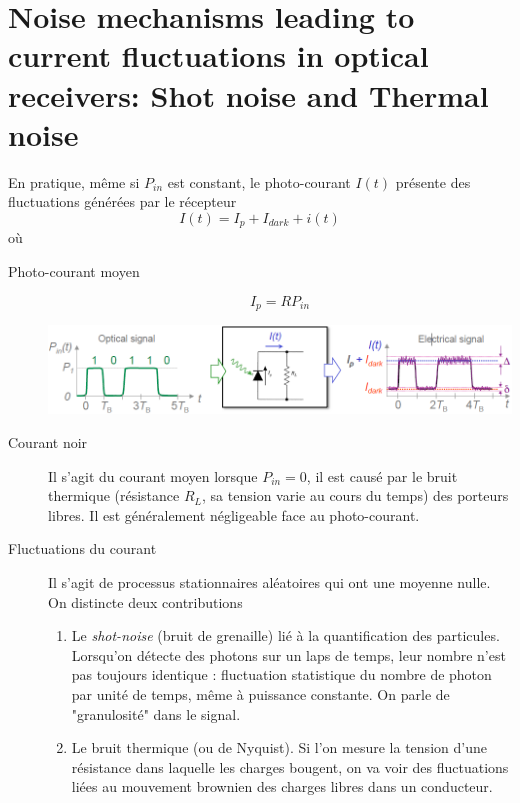 \section{Noise mechanisms leading to current fluctuations in optical receivers: Shot noise and Thermal noise}
En pratique, même si $P_{in}$ est constant, le photo-courant $I(t)$ présente des fluctuations 
générées par le récepteur
\begin{equation}
I(t) = I_p + I_{dark} + i(t)
\end{equation}
où
\begin{description}
\item[Photo-courant moyen]
\begin{equation}
I_p = RP_{in}
\end{equation}

\begin{center}
\includegraphics[scale=0.5]{ch5/image12}
\end{center}
\item[Courant noir] Il s'agit du courant moyen lorsque $P_{in}=0$, il est causé par le bruit thermique
(résistance $R_L$, sa tension varie au cours du temps) des porteurs libres. Il est généralement
négligeable face au photo-courant. 
\item[Fluctuations du courant] Il s'agit de processus stationnaires aléatoires qui ont une moyenne
nulle. On distincte deux contributions
\begin{enumerate}
\item Le \textit{shot-noise} (bruit de grenaille) lié à la quantification des particules. Lorsqu'on
détecte des photons sur un laps de temps, leur nombre n'est pas toujours identique : fluctuation
statistique du nombre de photon par unité de temps, même à puissance constante. On parle de 
"granulosité" dans le signal.
\item Le bruit thermique (ou de Nyquist). Si l'on mesure la tension d'une résistance dans laquelle
les charges bougent, on va voir des fluctuations liées au mouvement brownien des charges libres
dans un conducteur.
\end{enumerate}
\end{description}

\newpage

